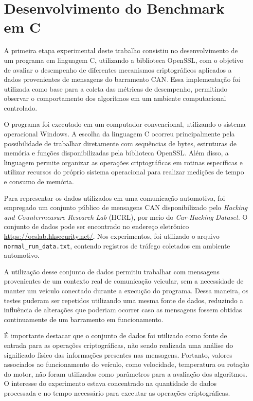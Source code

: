 \section{Desenvolvimento do Benchmark em C}

A primeira etapa experimental deste trabalho consistiu no desenvolvimento de um programa em linguagem C, utilizando a biblioteca OpenSSL, com o objetivo de avaliar o desempenho de diferentes mecanismos criptográficos aplicados a dados provenientes de mensagens do barramento CAN. Essa implementação foi utilizada como base para a coleta das métricas de desempenho, permitindo observar o comportamento dos algoritmos em um ambiente computacional controlado.

O programa foi executado em um computador convencional, utilizando o sistema operacional Windows. A escolha da linguagem C ocorreu principalmente pela possibilidade de trabalhar diretamente com sequências de bytes, estruturas de memória e funções disponibilizadas pela biblioteca OpenSSL. Além disso, a linguagem permite organizar as operações criptográficas em rotinas específicas e utilizar recursos do próprio sistema operacional para realizar medições de tempo e consumo de memória.

Para representar os dados utilizados em uma comunicação automotiva, foi empregado um conjunto público de mensagens CAN disponibilizado pelo \textit{Hacking and Countermeasure Research Lab} (HCRL), por meio do \textit{Car-Hacking Dataset}. O conjunto de dados pode ser encontrado no endereço eletrônico \url{https://ocslab.hksecurity.net/}. Nos experimentos, foi utilizado o arquivo \texttt{normal\_run\_data.txt}, contendo registros de tráfego coletados em ambiente automotivo.

A utilização desse conjunto de dados permitiu trabalhar com mensagens provenientes de um contexto real de comunicação veicular, sem a necessidade de manter um veículo conectado durante a execução do programa. Dessa maneira, os testes puderam ser repetidos utilizando uma mesma fonte de dados, reduzindo a influência de alterações que poderiam ocorrer caso as mensagens fossem obtidas continuamente de um barramento em funcionamento.

É importante destacar que o conjunto de dados foi utilizado como fonte de entrada para as operações criptográficas, não sendo realizada uma análise do significado físico das informações presentes nas mensagens. Portanto, valores associados ao funcionamento do veículo, como velocidade, temperatura ou rotação do motor, não foram utilizados como parâmetros para a avaliação dos algoritmos. O interesse do experimento estava concentrado na quantidade de dados processada e no tempo necessário para executar as operações criptográficas.

